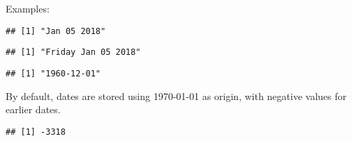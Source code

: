 \documentclass[]{book}
\newenvironment{Shaded}{\begin{snugshade}}{\end{snugshade}}
\newcommand{\KeywordTok}[1]{\textcolor[rgb]{0.13,0.29,0.53}{\textbf{#1}}}
\newcommand{\DataTypeTok}[1]{\textcolor[rgb]{0.13,0.29,0.53}{#1}}
\newcommand{\StringTok}[1]{\textcolor[rgb]{0.31,0.60,0.02}{#1}}
\newcommand{\CommentTok}[1]{\textcolor[rgb]{0.56,0.35,0.01}{\textit{#1}}}
\newcommand{\NormalTok}[1]{#1}
\theoremstyle{definition}
\theoremstyle{definition}
\theoremstyle{definition}
\theoremstyle{remark}
\begin{document}
Examples:

\begin{Shaded}
\end{Shaded}

\begin{verbatim}
## [1] "Jan 05 2018"
\end{verbatim}

\begin{Shaded}
\end{Shaded}

\begin{verbatim}
## [1] "Friday Jan 05 2018"
\end{verbatim}

\begin{Shaded}
\end{Shaded}

\begin{verbatim}
## [1] "1960-12-01"
\end{verbatim}

By default, dates are stored using 1970-01-01 as origin, with negative
values for earlier dates.

\begin{Shaded}
\end{Shaded}

\begin{verbatim}
## [1] -3318
\end{verbatim}
\end{document}
